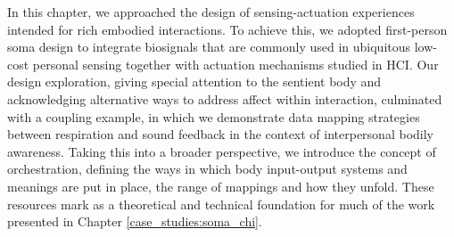 In this chapter, we approached the design of sensing-actuation experiences intended for rich embodied interactions. To achieve this, we adopted first-person soma design to integrate biosignals that are commonly used in ubiquitous low-cost personal sensing together with actuation mechanisms studied in HCI. Our design exploration, giving special attention to the sentient body and acknowledging alternative ways to address affect within interaction, culminated with a coupling example, in which we demonstrate data mapping strategies between respiration and sound feedback in the context of interpersonal bodily awareness. Taking this into a broader perspective, we introduce the concept of orchestration, defining the ways in which body input-output systems and meanings are put in place, the range of mappings and how they unfold. These resources mark as a theoretical and technical foundation for much of the work presented in Chapter \ref{case_studies:soma_chi}.

